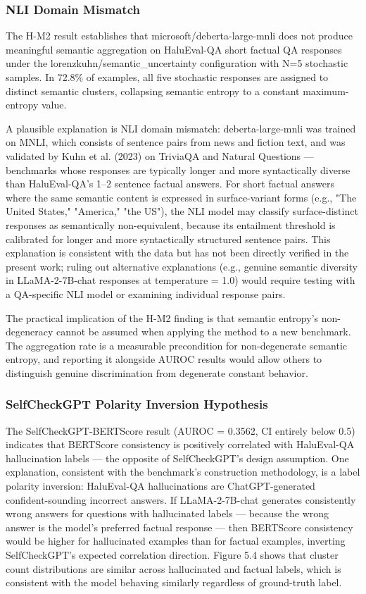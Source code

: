 
\subsubsection{NLI Domain Mismatch}

The H-M2 result establishes that microsoft/deberta-large-mnli does not produce meaningful semantic aggregation on HaluEval-QA short factual QA responses under the lorenzkuhn/semantic_uncertainty configuration with N=5 stochastic samples. In 72.8\% of examples, all five stochastic responses are assigned to distinct semantic clusters, collapsing semantic entropy to a constant maximum-entropy value.

A plausible explanation is NLI domain mismatch: deberta-large-mnli was trained on MNLI, which consists of sentence pairs from news and fiction text, and was validated by Kuhn et al. (2023) on TriviaQA and Natural Questions — benchmarks whose responses are typically longer and more syntactically diverse than HaluEval-QA's 1–2 sentence factual answers. For short factual answers where the same semantic content is expressed in surface-variant forms (e.g., "The United States," "America," "the US"), the NLI model may classify surface-distinct responses as semantically non-equivalent, because its entailment threshold is calibrated for longer and more syntactically structured sentence pairs. This explanation is consistent with the data but has not been directly verified in the present work; ruling out alternative explanations (e.g., genuine semantic diversity in LLaMA-2-7B-chat responses at temperature = 1.0) would require testing with a QA-specific NLI model or examining individual response pairs.

The practical implication of the H-M2 finding is that semantic entropy's non-degeneracy cannot be assumed when applying the method to a new benchmark. The aggregation rate is a measurable precondition for non-degenerate semantic entropy, and reporting it alongside AUROC results would allow others to distinguish genuine discrimination from degenerate constant behavior.

\subsubsection{SelfCheckGPT Polarity Inversion Hypothesis}

The SelfCheckGPT-BERTScore result (AUROC = 0.3562, CI entirely below 0.5) indicates that BERTScore consistency is positively correlated with HaluEval-QA hallucination labels — the opposite of SelfCheckGPT's design assumption. One explanation, consistent with the benchmark's construction methodology, is a label polarity inversion: HaluEval-QA hallucinations are ChatGPT-generated confident-sounding incorrect answers. If LLaMA-2-7B-chat generates consistently wrong answers for questions with hallucinated labels — because the wrong answer is the model's preferred factual response — then BERTScore consistency would be higher for hallucinated examples than for factual examples, inverting SelfCheckGPT's expected correlation direction. Figure 5.4 shows that cluster count distributions are similar across hallucinated and factual labels, which is consistent with the model behaving similarly regardless of ground-truth label.

